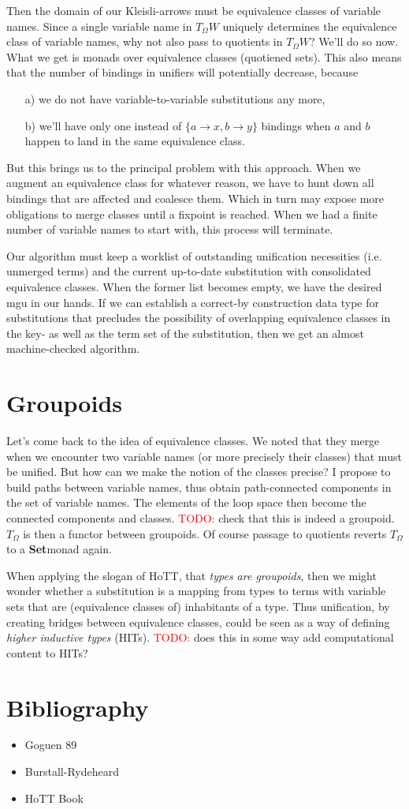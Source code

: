 \documentclass{article}
\newcommand \todo[1] {\textcolor{red}{TODO: }#1}
\newcommand \catname[1] {{\normalfont\textbf{#1}}}
\newcommand \Set {\catname {Set}}
\begin{document}
Then the domain of our Kleisli-arrows must be equivalence classes of variable names. Since a single variable name in $T_{\Omega}W$ uniquely determines the equivalence class of variable names, why not also pass to quotients in $T_{\Omega}W$?
We'll do so now. What we get is monads over equivalence classes (quotiened sets). This also means that the number of bindings in unifiers will potentially decrease, because
\begin{itemize}
\item[a)] we do not have variable-to-variable substitutions any more,
\item[b)] we'll have only one instead of $\{a \to x, b \to y\}$ bindings when $a$ and $b$ happen to land in the same equivalence class.
\end{itemize}
But this brings us to the principal problem with this approach. When we augment an equivalence class for whatever reason, we have to hunt down all bindings that are affected and coalesce them. Which in turn may expose more obligations to merge classes until a fixpoint is reached. When we had a finite number of variable names to start with, this process will terminate.
\par Our algorithm must keep a worklist of outstanding unification necessities (i.e. unmerged terms) and the current up-to-date substitution with consolidated equivalence classes.
When the former list becomes empty, we have the desired mgu in our hands.
If we can establish a correct-by construction data type for substitutions that precludes the possibility of overlapping equivalence classes in the key- as well as the term set of the substitution, then we get an almost machine-checked algorithm.

\section {Groupoids}
Let's come back to the idea of equivalence classes. We noted that they merge when we encounter two variable names (or more precisely their classes) that must be unified. But how can we make the notion of the classes precise? I propose to build paths between variable names, thus obtain path-connected components in the set of variable names. The elements of the loop space then become the connected components and classes. \todo {check that this is indeed a groupoid.} $T_{\Omega}$ is then a functor between groupoids. Of course passage to quotients reverts $T_{\Omega}$ to a \Set monad again.
\par When applying the slogan of HoTT, that \emph {types are groupoids}, then we might wonder whether a substitution is a mapping from types to terms with variable sets that are (equivalence classes of) inhabitants of a type. Thus unification, by creating bridges between equivalence classes, could be seen as a way of defining \emph {higher inductive types} (HITs). \todo {does this in some way add computational content to HITs?}

\section {Bibliography}
\begin{itemize}
\item Goguen 89
\item Burstall-Rydeheard
\item HoTT Book
\end{itemize}
\end{document}
